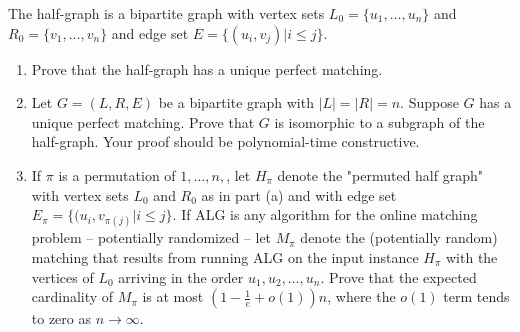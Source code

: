\documentclass{hmcpset}
\begin{document}
\begin{problem}[1]
The half-graph is a bipartite graph with vertex sets $L_0 = \{u_1,\ldots,u_n\}$ and $R_0 = \{v_1,\ldots,v_n\}$ and edge set $E = \{(u_i, v_j) | i \leq j\}$.
\begin{enumerate}
\item Prove that the half-graph has a unique perfect matching.
\item Let $G = (L,R,E)$ be a bipartite graph with $|L| = |R| = n$. Suppose $G$ has a unique perfect matching. Prove that $G$ is isomorphic to a subgraph of the half-graph. Your proof should be polynomial-time constructive.
\item If $\pi$ is a permutation of ${1,\ldots,n},$, let $H_\pi$ denote the "permuted half graph" with vertex sets $L_0$ and $R_0$ as in part (a) and with edge set $E_\pi = \{(u_i, v_{\pi(j)} | i \leq j\}$. If ALG is any algorithm for the online matching problem -- potentially randomized -- let $M_\pi$ denote the (potentially random) matching that results from running ALG on the input instance $H_\pi$ with the vertices of $L_0$ arriving in the order $u_1, u_2, \ldots, u_n$. Prove that the expected cardinality of $M_\pi$ is at most $(1-\frac{1}{e} + o(1))n$, where the $o(1)$ term tends to zero as $n\rightarrow \infty$.
\end{enumerate}
\end{problem}
\end{document}
